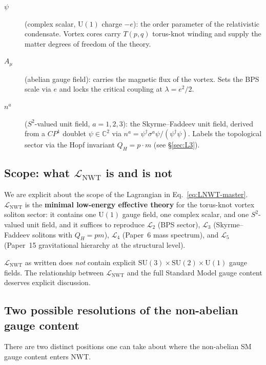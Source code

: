 \documentclass[11pt]{article}
\newcommand{\Lnwt}{\mathcal{L}_\text{NWT}}
\begin{document}
\begin{description}
\item[$\psi$] (complex scalar, $\mathrm{U}(1)$ charge $-e$):
  the order parameter of the relativistic condensate.  Vortex cores
  carry $T(p, q)$ torus-knot winding and supply the matter degrees
  of freedom of the theory.

\item[$A_\mu$] (abelian gauge field):
  carries the magnetic flux of the vortex.  Sets the BPS scale via
  $e$ and locks the critical coupling at $\lambda = e^2/2$.

\item[$n^a$] ($S^2$-valued unit field, $a = 1,2,3$):
  the Skyrme--Faddeev unit field, derived from a $CP^1$ doublet
  $\psi \in \mathbb{C}^2$ via $n^a = \psi^\dagger \sigma^a \psi /
  (\psi^\dagger \psi)$.  Labels the topological sector via the Hopf
  invariant $Q_H = p \cdot m$ (see \S\ref{sec:L3}).
\end{description}

\subsection{Scope: what $\Lnwt$ is and is not}
\label{sec:L1-scope}

We are explicit about the scope of the Lagrangian in
Eq.~\ref{eq:LNWT-master}.  $\Lnwt$ is the \textbf{minimal
low-energy effective theory} for the torus-knot vortex soliton
sector: it contains one $\mathrm{U}(1)$ gauge field, one complex
scalar, and one $S^2$-valued unit field, and it suffices to
reproduce $\mathcal{L}_2$ (BPS sector), $\mathcal{L}_3$
(Skyrme--Faddeev solitons with $Q_H = p m$), $\mathcal{L}_4$
(Paper~6 mass spectrum), and $\mathcal{L}_5$ (Paper~15 gravitational
hierarchy at the structural level).

$\Lnwt$ as written does \emph{not} contain explicit
$\mathrm{SU}(3) \times \mathrm{SU}(2) \times \mathrm{U}(1)$ gauge
fields.  The relationship between $\Lnwt$ and the full Standard
Model gauge content deserves explicit discussion.

\subsection{Two possible resolutions of the non-abelian gauge
content}
\label{sec:L1-AB}

There are two distinct positions one can take about where the
non-abelian SM gauge content enters NWT.
\end{document}

